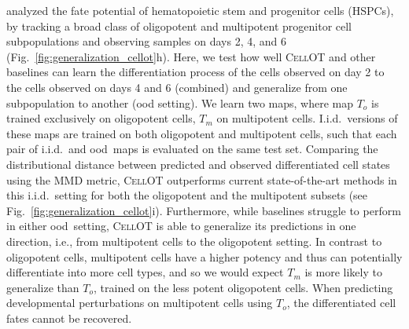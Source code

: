 \citet{weinreb2020lineage} analyzed the fate potential of hematopoietic stem and progenitor cells (HSPCs), by tracking a broad class of oligopotent %
and multipotent %
 progenitor cell subpopulations and observing samples on days 2, 4, and 6 (Fig.~\ref{fig:generalization_cellot}h).
Here, we test how well \textsc{CellOT} and other baselines can learn the differentiation process of the cells observed on day 2 to the cells observed on days 4 and 6 (combined) and generalize from one subpopulation to another (\acrshort{ood} setting).
We learn two maps, where map $T_o$ is trained exclusively on oligopotent cells, $T_m$ on multipotent cells.
I.i.d.~versions of these maps are trained on both oligopotent and multipotent cells, such that each pair of i.i.d.~and \acrshort{ood}~maps is evaluated on the same test set.
Comparing the distributional distance between predicted and observed differentiated cell states using the \acrshort{MMD} metric, \textsc{CellOT} outperforms current state-of-the-art methods in this i.i.d.~setting for both the oligopotent and the multipotent subsets (see Fig.~\ref{fig:generalization_cellot}i).
Furthermore, while baselines struggle to perform in either \acrshort{ood}~setting, \textsc{CellOT} is able to generalize its predictions in one direction, i.e., from multipotent cells to the oligopotent setting.
In contrast to oligopotent cells, multipotent cells have a higher potency and thus can potentially differentiate into more cell types, and so we would expect $T_m$ is more likely to generalize than $T_o$, trained on the less potent oligopotent cells.
When predicting developmental perturbations on multipotent cells using $T_o$, the differentiated cell fates cannot be recovered.

